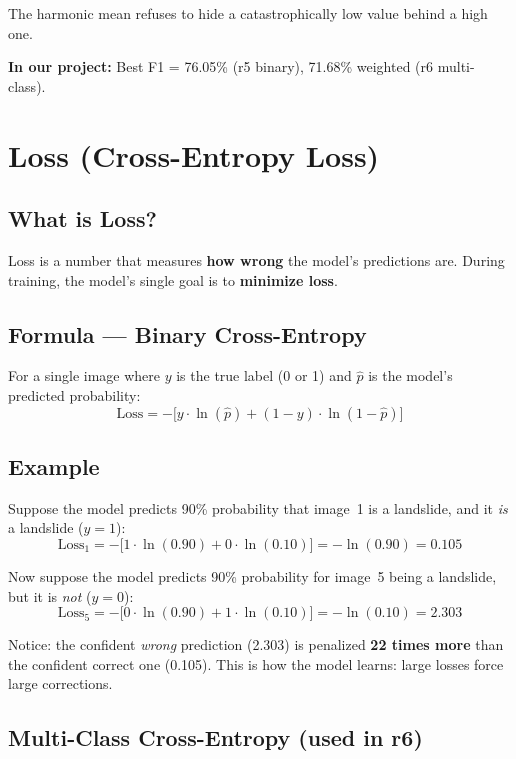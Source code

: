 \documentclass[11pt]{article}
\begin{document}
\noindent The harmonic mean refuses to hide a catastrophically low value behind a high one.

\medskip
\noindent\textbf{In our project:} Best F1 = 76.05\% (r5 binary), 71.68\% weighted (r6 multi-class).

\section{Loss (Cross-Entropy Loss)}

\subsection{What is Loss?}

Loss is a number that measures \textbf{how wrong} the model's predictions are.
During training, the model's single goal is to \textbf{minimize loss}.

\subsection{Formula --- Binary Cross-Entropy}

For a single image where $y$ is the true label (0 or 1) and $\hat{p}$ is the model's predicted probability:
\[
\text{Loss} = -\Big[ y \cdot \ln(\hat{p}) + (1-y) \cdot \ln(1 - \hat{p}) \Big]
\]

\subsection{Example}

Suppose the model predicts 90\% probability that image~1 is a landslide, and it \emph{is} a landslide ($y=1$):
\[
\text{Loss}_1 = -\Big[ 1 \cdot \ln(0.90) + 0 \cdot \ln(0.10) \Big] = -\ln(0.90) = 0.105
\]

\noindent Now suppose the model predicts 90\% probability for image~5 being a landslide, but it is \emph{not} ($y=0$):
\[
\text{Loss}_5 = -\Big[ 0 \cdot \ln(0.90) + 1 \cdot \ln(0.10) \Big] = -\ln(0.10) = 2.303
\]

\noindent Notice: the confident \emph{wrong} prediction (2.303) is penalized \textbf{22 times more} than the confident correct one (0.105).
This is how the model learns: large losses force large corrections.

\subsection{Multi-Class Cross-Entropy (used in r6)}
\end{document}
